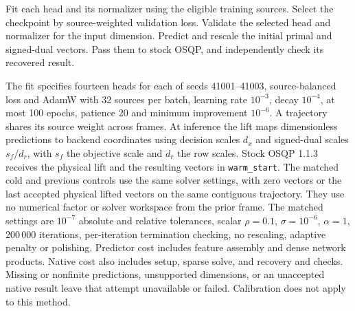 \begin{algorithm}[ht]
\caption{Train and apply a dimension-specific OSQP initializer}\label{alg:learn-osqp}
\begin{algorithmic}[1]
\State Fit each head and its normalizer using the eligible training sources.
\State Select the checkpoint by source-weighted validation loss.
\State Validate the selected head and normalizer for the input dimension.
\State Predict and rescale the initial primal and signed-dual vectors.
\State Pass them to stock OSQP, and independently check its recovered result.
\end{algorithmic}
\end{algorithm}

The fit specifies fourteen heads for each of seeds 41001--41003,
source-balanced loss and AdamW with 32 sources per batch,
learning rate \(10^{-3}\), decay \(10^{-4}\), at most 100 epochs,
patience 20 and minimum improvement \(10^{-6}\). A trajectory shares
its source weight across frames. At inference the lift maps
dimensionless predictions to backend coordinates using decision
scales \(d_x\) and signed-dual scales \(s_f/d_r\), with \(s_f\)
the objective scale and \(d_r\) the row scales. Stock OSQP 1.1.3
receives the physical lift and the resulting vectors in
\texttt{warm\_start}. The matched cold and previous controls use the
same solver settings, with zero vectors or the last accepted
physical lifted vectors on the same contiguous trajectory.
They use no numerical factor or solver workspace from the prior
frame. The matched settings are \(10^{-7}\) absolute and relative
tolerances, scalar \(\rho=0.1\), \(\sigma=10^{-6}\), \(\alpha=1\),
\(200\,000\) iterations, per-iteration termination checking, no
rescaling, adaptive penalty or polishing. Predictor cost includes
feature assembly and dense network products. Native cost also
includes setup, sparse solve, and recovery and checks. Missing or
nonfinite predictions, unsupported dimensions, or an unaccepted
native result leave that attempt unavailable or failed. Calibration
does not apply to this method.
